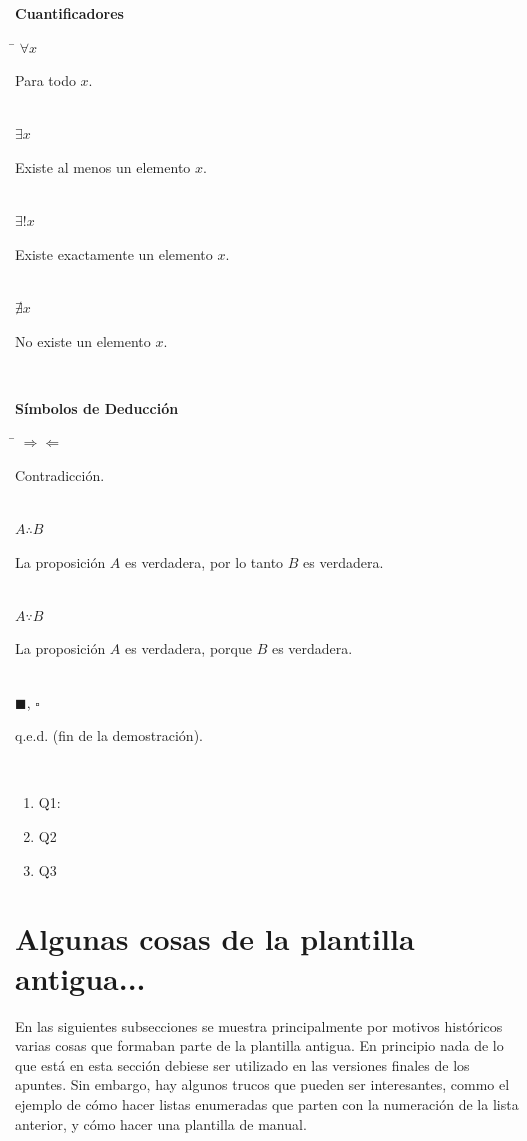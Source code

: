 \documentclass[11pt,letterpaper,twoside]{report}%
\begin{document}
{\bf Cuantificadores}
\begin{tabbing}
\hspace{\hdiml} \= \hspace{\hdim} \kill
$\forall x$ \> \parbox[t]{\hdim}{Para todo $x$.}\\[\lsk]
$\exists x$ \> \parbox[t]{\hdim}{Existe al menos un elemento $x$.}\\[\lsk]
$\exists! x$ \> \parbox[t]{\hdim}{Existe exactamente un elemento $x$.}\\[\lsk]
$\nexists x$ \> \parbox[t]{\hdim}{No existe un elemento $x$.}\\[\lsk]
\end{tabbing}

{\bf Símbolos de Deducción}
\begin{tabbing}
\hspace{\hdiml} \= \hspace{\hdim} \kill
$\Rightarrow\Leftarrow$ \> \parbox[t]{\hdim}{Contradicción.}\\[\lsk]
$A\therefore B$ \> \parbox[t]{\hdim}{La proposición $A$ es verdadera, por lo tanto $B$ es verdadera.}\\[\lsk]
$A\because B$ \> \parbox[t]{\hdim}{La proposición $A$ es verdadera, porque $B$ es verdadera.}\\[\lsk]
$\blacksquare$, $\square$ \> \parbox[t]{\hdim}{q.e.d. (fin de la demostración).}\\[\lsk]
\end{tabbing}



\begin{enumerate}
\setcounter{enumi}{\value{total}}
\item Q1: 
\item Q2
\item Q3

\setcounter{total}{\value{enumi}}
\end{enumerate}



\newpage
\section{Algunas cosas de la plantilla antigua...}

En las siguientes subsecciones se muestra principalmente por motivos históricos varias cosas que formaban parte de la plantilla antigua.  En principio nada de lo que está en esta sección debiese ser utilizado en las versiones finales de los apuntes.  Sin embargo, hay algunos trucos que pueden ser interesantes, commo el ejemplo de cómo hacer listas enumeradas que parten con la numeración de la lista anterior, y cómo hacer una plantilla de manual.
\end{document}
